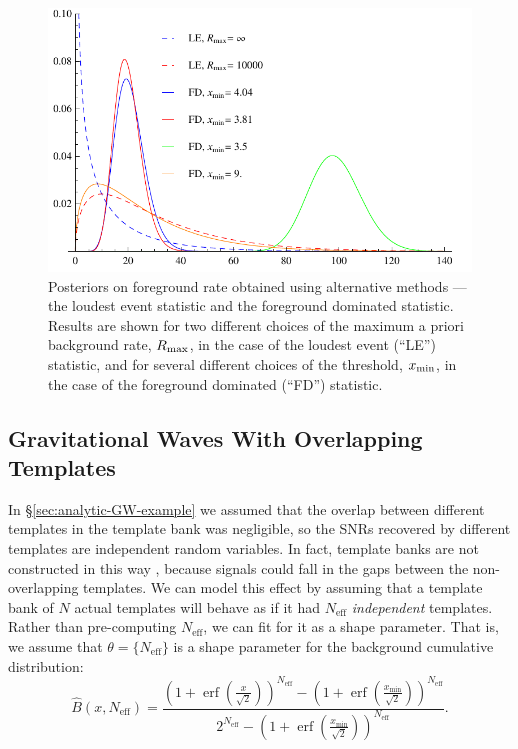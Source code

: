 \documentclass[aps,prd]{revtex4-1}
\newcommand{\xmin}{x_\mathrm{min}}
\DeclareMathOperator{\erf}{erf}
\begin{document}
\begin{figure}
  \includegraphics[width=\columnwidth]{AltMethodComp}
  \caption{\label{fig:altmeth}Posteriors on foreground rate obtained using alternative methods --- the loudest event statistic and the foreground dominated statistic. Results are shown for two different choices of the maximum a priori background rate, $R_{\rm max}$, in the case of the loudest event (``LE'') statistic, and for several different choices of the threshold, $x_{\rm min}$, in the case of the foreground dominated (``FD'') statistic.} 
\end{figure}

\subsection{Gravitational Waves With Overlapping Templates}
\label{sec:gw-overlapping-template}

In \S \ref{sec:analytic-GW-example} we assumed that the overlap
between different templates in the template bank was
  negligible, so the SNRs recovered by different templates are
independent random variables.  In fact, template banks are not
constructed in this way \citep[e.g.,][]{Owen:1998dk,Ajith:2008},
because signals could fall in the gaps between the non-overlapping
templates.  We can model this effect by assuming that a template bank
of $N$ actual templates will behave as if it had $N_\mathrm{eff}$
\emph{independent} templates.   Rather than pre-computing
  $N_\mathrm{eff}$, we can fit for it as a shape parameter.
That is, we assume that $\theta = \{N_\mathrm{eff}\}$ is a
shape parameter for the background cumulative distribution:
\begin{equation}
  \hat{B}\left(x, N_\mathrm{eff}\right) = \frac{\left( 1 + \erf\left( \frac{x}{\sqrt{2}} \right)
    \right)^{N_\mathrm{eff}} - \left( 1 + \erf\left( \frac{\xmin}{\sqrt{2}} \right)
    \right)^{N_\mathrm{eff}}}{2^{N_\mathrm{eff}} - \left( 1 + \erf\left( \frac{\xmin}{\sqrt{2}} \right)
    \right)^{N_\mathrm{eff}} }.
\end{equation}
\end{document}
